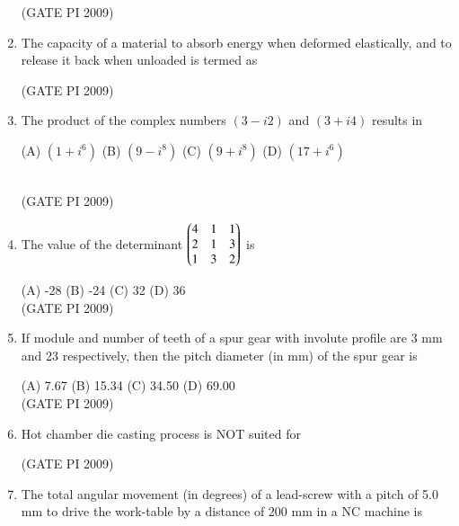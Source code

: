 \documentclass[journal,12pt,onecolumn]{IEEEtran}
\theoremstyle{remark}
\begin{document}
\begin{enumerate}[label=Q.\arabic*]
\begin{enumerate}[label=(\Alph*)]
\end{enumerate}
\hfill (GATE PI 2009)
\item The capacity of a material to absorb energy when deformed elastically, and to release it back when unloaded is termed as
\begin{enumerate}[label=(\Alph*)]
\end{enumerate}
\hfill (GATE PI 2009)
\item The product of the complex numbers $(3 - i2)$ and $(3 + i4)$ results in

(A) $(1 + i^6)$ \hfill (B) $(9-i^8)$ \hfill (C) $(9+i^8)$ \hfill (D) $(17 + i^6)$ \\\

\hfill (GATE PI 2009)
\item The value of the determinant
$
\begin{pmatrix}
4 & 1 & 1 \\
2 & 1 & 3 \\
1 & 3 & 2
\end{pmatrix}
$
is

(A) -28 \hfill (B) -24 \hfill(C) 32 \hfill (D) 36 \\

\hfill (GATE PI 2009)

\item If module and number of teeth of a spur gear with involute profile are 3 mm and 23 respectively, then the pitch diameter (in mm) of the spur gear is

(A) 7.67 \hfill (B) 15.34 \hfill (C) 34.50 \hfill (D) 69.00  \\

\hfill (GATE PI 2009)
\item Hot chamber die casting process is NOT suited for
\begin{enumerate}[label=(\Alph*)]
\end{enumerate}
\hfill (GATE PI 2009)
\item The total angular movement (in degrees) of a lead-screw with a pitch of 5.0 mm to drive the work-table by a distance of 200 mm in a NC machine is


\end{enumerate}
\end{document}
